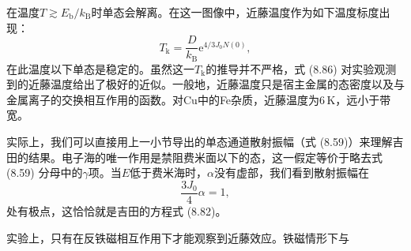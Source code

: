 在温度$T\gtrsim E_{\mathrm{b}}/k_{\mathrm{B}}$时单态会解离。在这一图像中，近藤温度作为如下温度标度出现：
\begin{equation*}
T_{\mathrm{k}} = \frac{D}{k_{\mathrm{B}}}\mathrm{e}^{4/3J_0N(0)},
\tag{8.86}
\end{equation*}
在此温度以下单态是稳定的。虽然这一$T_{\mathrm{k}}$的推导并不严格，式 (8.86) 对实验观测到的近藤温度给出了极好的近似。一般地，近藤温度只是宿主金属的态密度以及与金属离子的交换相互作用的函数。对Cu中的Fe杂质，近藤温度为$6\,\mathrm{K}$，远小于带宽。

实际上，我们可以直接用上一小节导出的单态通道散射振幅（式 (8.59)）来理解吉田的结果。电子海的唯一作用是禁阻费米面以下的态，这一假定等价于略去式 (8.59) 分母中的$\gamma$项。当$E$低于费米海时，$\alpha$没有虚部，我们看到散射振幅在
\begin{equation*}
\frac{3J_0}{4}\alpha = 1,
\tag{8.87}
\end{equation*}
处有极点，这恰恰就是吉田的方程式 (8.82)。

实验上，只有在反铁磁相互作用下才能观察到近藤效应。铁磁情形下与
